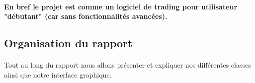 \paragraph{ En bref le projet est comme un logiciel de trading pour utilisateur "débutant" (car sans fonctionnalités avancées).}
\subsection{Organisation du rapport}
\paragraph{} Tout au long du rapport nous allons présenter et expliquer nos différentes classes ainsi que notre interface graphique. 
